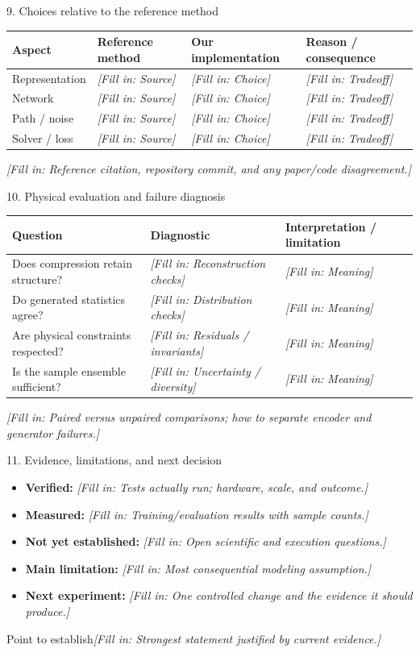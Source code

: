 \documentclass[aspectratio=169,11pt]{beamer}
\newcommand{\fillin}[1]{{\color{prompt}\textit{[Fill in: #1]}}}
\newcommand{\takeaway}[1]{\begin{block}{Point to establish}#1\end{block}}
\begin{document}
\begin{frame}{9. Choices relative to the reference method}
  \small
  \begin{tabularx}{\linewidth}{XXXX}
    \toprule
    Aspect & Reference method & Our implementation & Reason / consequence \\
    \midrule
    Representation & \fillin{Source} & \fillin{Choice} & \fillin{Tradeoff} \\
    Network & \fillin{Source} & \fillin{Choice} & \fillin{Tradeoff} \\
    Path / noise & \fillin{Source} & \fillin{Choice} & \fillin{Tradeoff} \\
    Solver / loss & \fillin{Source} & \fillin{Choice} & \fillin{Tradeoff} \\
    \bottomrule
  \end{tabularx}
  \medskip
  \fillin{Reference citation, repository commit, and any paper/code disagreement.}
\end{frame}

\begin{frame}{10. Physical evaluation and failure diagnosis}
  \small
  \begin{tabularx}{\linewidth}{XXX}
    \toprule
    Question & Diagnostic & Interpretation / limitation \\
    \midrule
    Does compression retain structure? & \fillin{Reconstruction checks} & \fillin{Meaning} \\
    Do generated statistics agree? & \fillin{Distribution checks} & \fillin{Meaning} \\
    Are physical constraints respected? & \fillin{Residuals / invariants} & \fillin{Meaning} \\
    Is the sample ensemble sufficient? & \fillin{Uncertainty / diversity} & \fillin{Meaning} \\
    \bottomrule
  \end{tabularx}
  \medskip
  \fillin{Paired versus unpaired comparisons; how to separate encoder and generator failures.}
\end{frame}

\begin{frame}{11. Evidence, limitations, and next decision}
  \begin{itemize}
    \item \textbf{Verified:} \fillin{Tests actually run; hardware, scale, and outcome.}
    \item \textbf{Measured:} \fillin{Training/evaluation results with sample counts.}
    \item \textbf{Not yet established:} \fillin{Open scientific and execution questions.}
    \item \textbf{Main limitation:} \fillin{Most consequential modeling assumption.}
    \item \textbf{Next experiment:} \fillin{One controlled change and the evidence it should produce.}
  \end{itemize}
  \takeaway{\fillin{Strongest statement justified by current evidence.}}
\end{frame}
\end{document}
